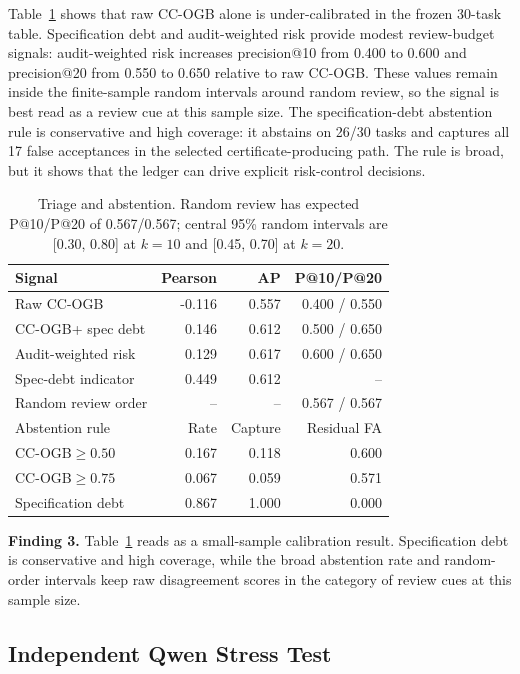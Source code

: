 \documentclass[conference]{IEEEtran}
\newcommand{\ccogb}{CC-OGB\xspace}
\begin{document}
Table~\ref{tab:triage} shows that raw \ccogb alone is under-calibrated in the frozen 30-task table.
Specification debt and audit-weighted risk provide modest review-budget signals: audit-weighted risk increases precision@10 from 0.400 to 0.600 and precision@20 from 0.550 to 0.650 relative to raw \ccogb.
These values remain inside the finite-sample random intervals around random review, so the signal is best read as a review cue at this sample size.
The specification-debt abstention rule is conservative and high coverage: it abstains on 26/30 tasks and captures all 17 false acceptances in the selected certificate-producing path.
The rule is broad, but it shows that the ledger can drive explicit risk-control decisions.

\begin{table}[t]
\caption{Triage and abstention. Random review has expected P@10/P@20 of 0.567/0.567; central 95\% random intervals are [0.30, 0.80] at $k=10$ and [0.45, 0.70] at $k=20$.}
\label{tab:triage}
\centering
\footnotesize
\begin{tabularx}{\columnwidth}{Xrrr}
\toprule
Signal & Pearson & AP & P@10/P@20 \\
\midrule
Raw \ccogb & -0.116 & 0.557 & 0.400 / 0.550 \\
\ccogb + spec debt & 0.146 & 0.612 & 0.500 / 0.650 \\
Audit-weighted risk & 0.129 & 0.617 & 0.600 / 0.650 \\
Spec-debt indicator & 0.449 & 0.612 & -- \\
Random review order & -- & -- & 0.567 / 0.567 \\
\midrule
Abstention rule & Rate & Capture & Residual FA \\
\midrule
\ccogb $\ge 0.50$ & 0.167 & 0.118 & 0.600 \\
\ccogb $\ge 0.75$ & 0.067 & 0.059 & 0.571 \\
Specification debt & 0.867 & 1.000 & 0.000 \\
\bottomrule
\end{tabularx}
\end{table}

\noindent\textbf{Finding 3.}
Table~\ref{tab:triage} reads as a small-sample calibration result.
Specification debt is conservative and high coverage, while the broad abstention rate and random-order intervals keep raw disagreement scores in the category of review cues at this sample size.

\subsection{Independent Qwen Stress Test}
\end{document}
